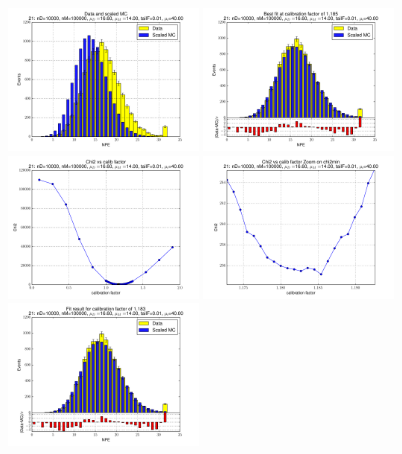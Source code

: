 
 \begin{figure}[htbp] \begin{center} 
\includegraphics[width=0.45\textwidth]{../FIGURES/21/FIG_Data_and_scaled_MC.pdf} 
\includegraphics[width=0.45\textwidth]{../FIGURES/21/FIG_Best_fit_at_calibration_factor_of_1_185.pdf} 
\includegraphics[width=0.45\textwidth]{../FIGURES/21/FIG_Chi2_vs_calib_factor.pdf} 
\includegraphics[width=0.45\textwidth]{../FIGURES/21/FIG_Chi2_vs_calib_factor_Zoom_on_chi2min.pdf} 
\includegraphics[width=0.45\textwidth]{../FIGURES/21/FIG_Fit_result_for_calibration_factor_of_1_183.pdf} 

\end{center}
\end{figure}
